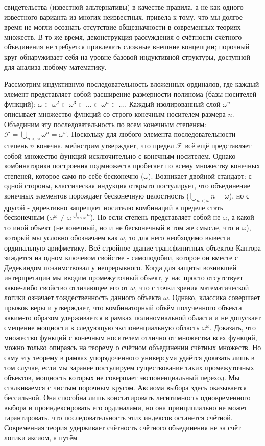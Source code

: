 \documentclass[12pt]{article}
\begin{document}
свидетельства (известной альтернативы) в качестве правила, а не как одного известного варианта из многих неизвестных, привела к тому, что мы долгое время не могли осознать отсутствие общезначности в современных теориях множеств. В то же время, деконструкция рассуждения о счётности счётного объединения не требуется привлекать сложные внешние концепции; порочный круг обнаруживает себя на уровне базовой индуктивной структуры, доступной для анализа любому математику.

Рассмотрим индуктивную последовательность вложенных ординалов, где каждый элемент представляет собой расширение размерности полинома (базы носителей функций): $\omega \subset \omega^2 \subset \omega^3 \subset \dots \subset \omega^n \subset \dots$. Каждый изолированный слой $\omega^n$ описывает множество функций со строго конечным носителем размера $n$. Объединим эту последовательность по всем конечным степеням: $\mathcal{F} = \bigcup_{n < \omega} \omega^n = \omega^{\omega}$. Поскольку для любого элемента последовательности степень $n$ конечна, мейнстрим утверждает, что предел $\mathcal{F}$ всё ещё представляет собой множество функций исключительно с конечным носителем. Однако комбинаторика построения подмножеств пробегает по всему множеству конечных степеней, которое само по себе бесконечно ($\omega$). Возникает двойной стандарт: с одной стороны, классическая индукция открыто постулирует, что объединение конечных элементов порождает бесконечную целостность ($\bigcup_{n < \omega} n = \omega$), но с другой - директивно запрещает носителю комбинаций в пределе стать бесконечным ($\omega^{\omega} \neq \omega^{\bigcup_{n < \omega} n}$). Но если степень представляет собой не $\omega$, а какой-то иной объект (не конечный, но и не бесконечный в том же смысле, что и $\omega$), который мы условно обозначаем как $\omega$, то для него необходимо вывести ординальную арифметику. Всё стройное здание трансфинитных объектов Кантора зиждется на одном ключевом свойстве - самоподобии, которое он вместе с Дедекиндом позаимствовал у непрерывного. Когда для защиты возникшей интерпретации мы вводим промежуточный объект, у нас просто отсутствует какое-либо свойство отличающее его от $\omega$, что с точки зрения математической логики означает тождественность данного объекта $\omega$. Однако, классика совершает прыжок веры и утверждает, что комбинаторный объём полученного объекта каким-то образом удерживается в рамках полиномиальной области и не допускает смещение мощности в следующую экспоненциальную область $\omega^\omega$. Доказать, что множество функций с конечным носителем отлично от множества всех функций, можно только опираясь на теорему о счётном объединении счётных множеств. Но саму эту теорему в рамках упорядоченного универсума удаётся доказать лишь в том случае, если мы заранее постулируем существование таких промежуточных объектов, мощность которых не совершает экспоненциальный переход. Мы сталкиваемся с чистым порочным кругом. Аксиома выбора здесь оказывается бессильной. Она способна лишь констатировать легитимность одновременного выбора и проиндексировать его ординалами, но она принципиально не может гарантировать, что последовательность этих индексов останется счётной. Современная теория удерживает счётность счётного объединения не за счёт логики аксиом, а путём 
\end{document}
